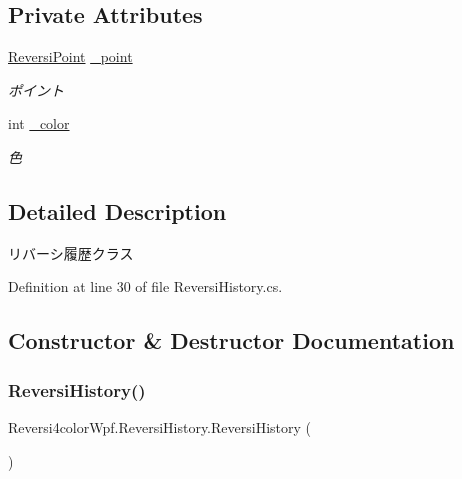 \subsection*{Private Attributes}
\begin{DoxyCompactItemize}
\item 
\mbox{\label{class_reversi4color_wpf_1_1_reversi_history_a5ddbef298068337346f9d5fc66294b06}} 
\hyperlink{class_reversi4color_wpf_1_1_reversi_point}{Reversi\+Point} \hyperlink{class_reversi4color_wpf_1_1_reversi_history_a5ddbef298068337346f9d5fc66294b06}{\+\_\+point}
\begin{DoxyCompactList}\small\item\em ポイント \end{DoxyCompactList}\item 
\mbox{\label{class_reversi4color_wpf_1_1_reversi_history_afedaee4e1900fe3eaaec9afc7b32a193}} 
int \hyperlink{class_reversi4color_wpf_1_1_reversi_history_afedaee4e1900fe3eaaec9afc7b32a193}{\+\_\+color}
\begin{DoxyCompactList}\small\item\em 色 \end{DoxyCompactList}\end{DoxyCompactItemize}


\subsection{Detailed Description}
リバーシ履歴クラス 

Definition at line 30 of file Reversi\+History.\+cs.



\subsection{Constructor \& Destructor Documentation}
\mbox{\label{class_reversi4color_wpf_1_1_reversi_history_a520d9daed923934bb9042cd0bcaafeb5}} 
\subsubsection{\texorpdfstring{Reversi\+History()}{ReversiHistory()}}
{\footnotesize\ttfamily Reversi4color\+Wpf.\+Reversi\+History.\+Reversi\+History (\begin{DoxyParamCaption}{ }\end{DoxyParamCaption})}



